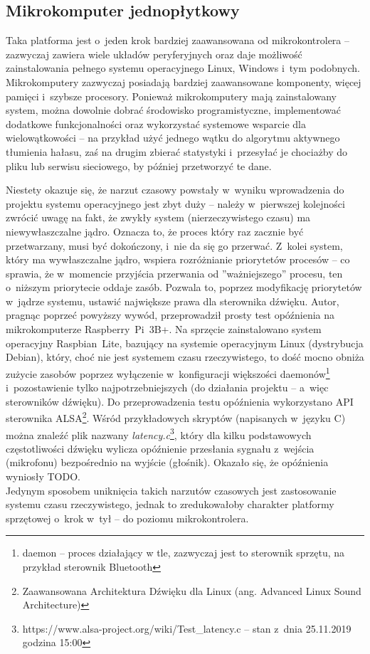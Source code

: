 \subsection{Mikrokomputer jednopłytkowy}
\label{mikrokomp}
Taka platforma jest o~jeden krok bardziej zaawansowana od mikrokontrolera -- zazwyczaj zawiera wiele układów peryferyjnych oraz daje możliwość zainstalowania pełnego systemu operacyjnego Linux, Windows i~tym podobnych. Mikrokomputery zazwyczaj posiadają bardziej zaawansowane komponenty, więcej pamięci i~szybsze procesory. Ponieważ mikrokomputery mają zainstalowany system, można dowolnie dobrać środowisko programistyczne, implementować dodatkowe funkcjonalności oraz wykorzystać systemowe wsparcie dla wielowątkowości -- na przykład użyć jednego wątku do algorytmu aktywnego tłumienia hałasu, zaś na drugim zbierać statystyki i~przesyłać je chociażby do pliku lub serwisu sieciowego, by później przetworzyć te dane.

Niestety okazuje się, że narzut czasowy powstały w~wyniku wprowadzenia do projektu systemu operacyjnego jest zbyt duży -- należy w~pierwszej kolejności zwrócić uwagę na fakt, że zwykły system (nierzeczywistego czasu) ma niewywłaszczalne jądro. Oznacza to, że proces który raz zacznie być przetwarzany, musi być dokończony, i~nie da się go przerwać. Z~kolei system, który ma wywłaszczalne jądro, wspiera rozróżnianie priorytetów procesów -- co sprawia, że w~momencie przyjścia przerwania od ''ważniejszego'' procesu, ten o~niższym priorytecie oddaje zasób. Pozwala to, poprzez modyfikację priorytetów w~jądrze systemu, ustawić największe prawa dla sterownika dźwięku.
Autor, pragnąc poprzeć powyższy wywód, przeprowadził prosty test opóźnienia na mikrokomputerze Raspberry~Pi~3B+. Na sprzęcie zainstalowano system operacyjny Raspbian~Lite, bazujący na systemie operacyjnym Linux (dystrybucja Debian), który, choć nie jest systemem czasu rzeczywistego, to dość mocno obniża zużycie zasobów poprzez wyłączenie w~konfiguracji większości daemonów\footnote{daemon -- proces działający w tle, zazwyczaj jest to sterownik sprzętu, na przykład sterownik Bluetooth} i~pozostawienie tylko najpotrzebniejszych (do działania projektu -- a~więc sterowników dźwięku). Do przeprowadzenia testu opóźnienia wykorzystano API sterownika ALSA\footnote{Zaawansowana Architektura Dźwięku dla Linux (ang. Advanced Linux Sound Architecture)}. Wśród przykładowych skryptów (napisanych w~języku C) można znaleźć plik nazwany \textit{latency.c}\footnote{https://www.alsa-project.org/wiki/Test\_latency.c -- stan z~dnia 25.11.2019 godzina 15:00}, który dla kilku podstawowych częstotliwości dźwięku wylicza opóźnienie przesłania sygnału z~wejścia (mikrofonu) bezpośrednio na wyjście (głośnik). Okazało się, że opóźnienia wyniosły TODO. %
\\
Jedynym sposobem uniknięcia takich narzutów czasowych jest zastosowanie systemu czasu rzeczywistego, jednak to zredukowałoby charakter platformy sprzętowej o~krok w~tył -- do poziomu mikrokontrolera.
